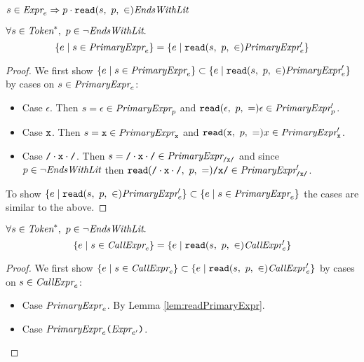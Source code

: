 \documentclass[preprint,10pt]{sigplanconf}
\begin{document}
\begin{lemma}
  \( s \in \textit{Expr}_{e} \Rightarrow p \cdot \texttt{read}(s,~p,~\in) \textit{EndsWithLit} \)
\end{lemma}

\begin{lemma}\mbox{}

  \( \forall s \in \textit{Token}^{*},~p \in \neg \textit{EndsWithLit}. \)
  \[
  \{ e \mid s \in \textit{PrimaryExpr}_{e} \}
  =
  \{ e \mid \texttt{read}(s,~p,~\in) \textit{PrimaryExpr}_{e}' \}
  \]
\end{lemma}
\begin{proof}
  We first show 
  \( \{ e \mid s \in \textit{PrimaryExpr}_{e} \} \subset
  \{ e \mid \texttt{read}(s,~p,~\in) \textit{PrimaryExpr}_{e}' \}
  \)
  by cases on \( s \in \textit{PrimaryExpr}_{e} \):
  \begin{itemize}

  \item Case \( \epsilon \). Then \( s = \epsilon \in
    \textit{PrimaryExpr}_{p} \) and \(
    \texttt{read}(\epsilon,~p,~=) \epsilon \in \textit{PrimaryExpr}_{p}' \).

  \item Case \( \texttt{x} \). Then \( s = \texttt{x} \in
    \textit{PrimaryExpr}_{\texttt{x}} \) and \( \texttt{read}(\texttt{x},~p,~=) x \in
    \textit{PrimaryExpr}_{\texttt{x}}' \).

  \item Case \( \texttt{/} \cdot \texttt{x} \cdot \texttt{/} \). Then \( s = \texttt{/} \cdot \texttt{x} \cdot \texttt{/} \in
    \textit{PrimaryExpr}_{\texttt{/x/}} \) and since \( p \in \neg \textit{EndsWithLit} \)
    then \( \texttt{read}(\texttt{/} \cdot \texttt{x} \cdot \texttt{/},~p,~=) \texttt{/x/} \in \textit{PrimaryExpr}_{\texttt{/x/}}' \).

  \end{itemize}
  To show 
  \( 
  \{ e \mid \texttt{read}(s,~p,~\in) \textit{PrimaryExpr}_{e}' \}
  \subset
  \{ e \mid s \in \textit{PrimaryExpr}_{e} \} 
  \) the cases are similar to the above.
\end{proof}

\begin{lemma}\mbox{}

  \( \forall s \in \textit{Token}^{*},~p \in \neg \textit{EndsWithLit}. \)
  \[
  \{ e \mid s \in \textit{CallExpr}_{e} \}
  =
  \{ e \mid \texttt{read}(s,~p,~\in) \textit{CallExpr}_{e}' \}
  \]
\end{lemma}
\begin{proof}
  We first show 
  \( \{ e \mid s \in \textit{CallExpr}_{e} \} \subset
  \{ e \mid \texttt{read}(s,~p,~\in) \textit{CallExpr}_{e}' \}
  \)
  by cases on \( s \in \textit{CallExpr}_{e} \):
  \begin{itemize}

  \item Case \( \textit{PrimaryExpr}_{e} \). By Lemma \ref{lem:readPrimaryExpr}.

  \item Case \( \textit{PrimaryExpr}_{e} \texttt{(}\textit{Expr}_{e'}\texttt{)} \).
  \end{itemize}
\end{proof}
\end{document}
